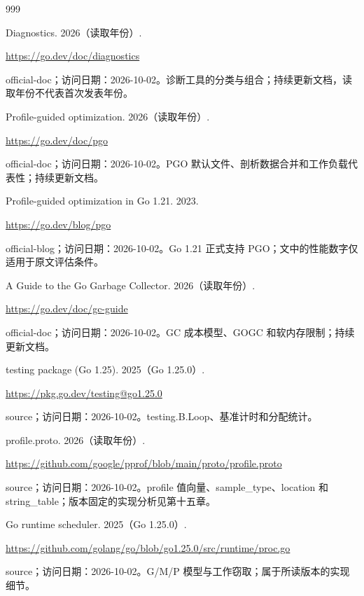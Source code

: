 \documentclass[UTF8,fontset=fandol,openany,11pt]{ctexbook}
\begin{document}
\clearpage
\endgroup
\backmatter
\begin{thebibliography}{999}
 Diagnostics. 2026（读取年份）.\par
\url{https://go.dev/doc/diagnostics}\par
{\small official-doc；访问日期：2026-10-02。诊断工具的分类与组合；持续更新文档，读取年份不代表首次发表年份。}

 Profile-guided optimization. 2026（读取年份）.\par
\url{https://go.dev/doc/pgo}\par
{\small official-doc；访问日期：2026-10-02。PGO 默认文件、剖析数据合并和工作负载代表性；持续更新文档。}

 Profile-guided optimization in Go 1.21. 2023.\par
\url{https://go.dev/blog/pgo}\par
{\small official-blog；访问日期：2026-10-02。Go 1.\allowbreak{}21 正式支持 PGO；文中的性能数字仅适用于原文评估条件。}

 A Guide to the Go Garbage Collector. 2026（读取年份）.\par
\url{https://go.dev/doc/gc-guide}\par
{\small official-doc；访问日期：2026-10-02。GC 成本模型、GOGC 和软内存限制；持续更新文档。}

 testing package (Go 1.25). 2025（Go 1.25.0）.\par
\url{https://pkg.go.dev/testing@go1.25.0}\par
{\small source；访问日期：2026-10-02。testing.\allowbreak{}B.\allowbreak{}Loop、基准计时和分配统计。}

 profile.proto. 2026（读取年份）.\par
\url{https://github.com/google/pprof/blob/main/proto/profile.proto}\par
{\small source；访问日期：2026-10-02。profile 值向量、sample\_\allowbreak{}type、location 和 string\_\allowbreak{}table；版本固定的实现分析见第十五章。}

 Go runtime scheduler. 2025（Go 1.25.0）.\par
\url{https://github.com/golang/go/blob/go1.25.0/src/runtime/proc.go}\par
{\small source；访问日期：2026-10-02。G/\allowbreak{}M/\allowbreak{}P 模型与工作窃取；属于所读版本的实现细节。}


\end{thebibliography}
\end{document}
